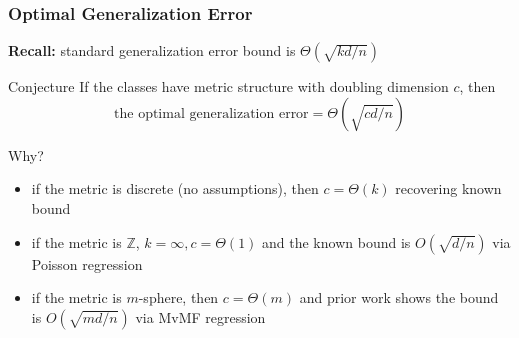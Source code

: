 \begin{frame}
\frametitle{Optimal Generalization Error}

\textbf{Recall:} standard generalization error bound is $\Theta(\sqrt{kd/n})$

\pause
\begin{block}{Conjecture}
If the classes have metric structure with doubling dimension $c$,
then 
\begin{equation}
\text{the optimal generalization error} = \Theta\left(\sqrt{cd/n}\right)
\end{equation}
\end{block}

\pause
Why?
\pause
\begin{itemize}
    \item if the metric is discrete (no assumptions), then $c=\Theta(k)$ recovering known bound
    \pause
\item if the metric is $\mathbb Z$, $k=\infty, c=\Theta(1)$ and the known bound is $O(\sqrt{d/n})$ via Poisson regression
    \pause
\item if the metric is $m$-sphere, then $c=\Theta(m)$ and prior work shows the bound is $O(\sqrt{md/n})$
via MvMF regression \citep{izbicki2019exploiting}
\end{itemize}

\end{frame}
